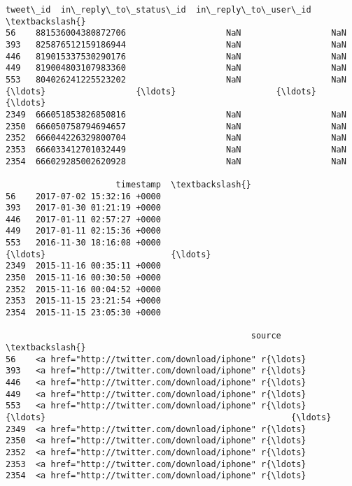 \documentclass[11pt]{article}
\makeatletter
\newcommand{\boxspacing}{\kern\kvtcb@left@rule\kern\kvtcb@boxsep}
\newcommand{\prompt}[4]{
        \ttfamily\llap{{\color{#2}[#3]:\hspace{3pt}#4}}\vspace{-\baselineskip}
    }
\makeatother
\begin{document}
            \begin{tcolorbox}[breakable, size=fbox, boxrule=.5pt, pad at break*=1mm, opacityfill=0]
\prompt{Out}{outcolor}{99}{\boxspacing}
\begin{Verbatim}[commandchars=\\\{\}]
                tweet\_id  in\_reply\_to\_status\_id  in\_reply\_to\_user\_id  \textbackslash{}
56    881536004380872706                    NaN                  NaN
393   825876512159186944                    NaN                  NaN
446   819015337530290176                    NaN                  NaN
449   819004803107983360                    NaN                  NaN
553   804026241225523202                    NaN                  NaN
{\ldots}                  {\ldots}                    {\ldots}                  {\ldots}
2349  666051853826850816                    NaN                  NaN
2350  666050758794694657                    NaN                  NaN
2352  666044226329800704                    NaN                  NaN
2353  666033412701032449                    NaN                  NaN
2354  666029285002620928                    NaN                  NaN

                      timestamp  \textbackslash{}
56    2017-07-02 15:32:16 +0000
393   2017-01-30 01:21:19 +0000
446   2017-01-11 02:57:27 +0000
449   2017-01-11 02:15:36 +0000
553   2016-11-30 18:16:08 +0000
{\ldots}                         {\ldots}
2349  2015-11-16 00:35:11 +0000
2350  2015-11-16 00:30:50 +0000
2352  2015-11-16 00:04:52 +0000
2353  2015-11-15 23:21:54 +0000
2354  2015-11-15 23:05:30 +0000

                                                 source  \textbackslash{}
56    <a href="http://twitter.com/download/iphone" r{\ldots}
393   <a href="http://twitter.com/download/iphone" r{\ldots}
446   <a href="http://twitter.com/download/iphone" r{\ldots}
449   <a href="http://twitter.com/download/iphone" r{\ldots}
553   <a href="http://twitter.com/download/iphone" r{\ldots}
{\ldots}                                                 {\ldots}
2349  <a href="http://twitter.com/download/iphone" r{\ldots}
2350  <a href="http://twitter.com/download/iphone" r{\ldots}
2352  <a href="http://twitter.com/download/iphone" r{\ldots}
2353  <a href="http://twitter.com/download/iphone" r{\ldots}
2354  <a href="http://twitter.com/download/iphone" r{\ldots}


\end{Verbatim}
\end{tcolorbox}
\end{document}
